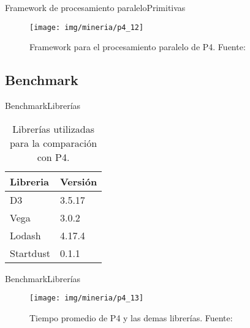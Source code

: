 \documentclass[10pt]{beamer}
\newcommand{\1}{
	\setbeamertemplate{background}{
		\texttt{[image: img/1]}
		\tikz[overlay] \fill[fill opacity=0.75,fill=white] (0,0) rectangle (-\paperwidth,\paperheight);
	}
}
\begin{document}
\begin{frame}{Framework de procesamiento paralelo}{Primitivas}
\begin{figure}[]
	\centering
	\texttt{[image: img/mineria/p4\_12]}
	\caption{Framework para el procesamiento paralelo de P4. Fuente: \cite{li2018p4}}
\end{figure}
\end{frame}


\subsection{Benchmark}


\begin{frame}{Benchmark}{Librerías}
\begin{table}[]
	\caption{Librerías utilizadas para la comparación con P4.}
	\begin{tabular}{ll}
		\hline
		Libreria  & Versión \\ \hline
		D3        & 3.5.17  \\
		Vega      & 3.0.2   \\
		Lodash    & 4.17.4  \\
		Startdust & 0.1.1  
	\end{tabular}
\end{table}
\end{frame}


\begin{frame}{Benchmark}{Librerías}
	\begin{figure}[]
		\centering
		\texttt{[image: img/mineria/p4\_13]}
		\caption{Tiempo promedio de P4 y las demas librerías. Fuente: \cite{li2018p4}}
	\end{figure}
\end{frame}
\end{document}

